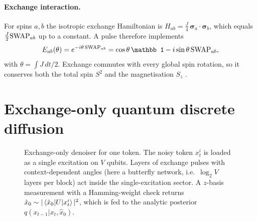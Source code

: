 \paragraph{Exchange interaction.}
For spins $a,b$ the isotropic exchange Hamiltonian is
$H_{ab}=\tfrac{J}{4}\,\bm\sigma_a\!\cdot\!\bm\sigma_b$, which equals $\tfrac{J}{2}\mathrm{SWAP}_{ab}$ up
to a constant. A pulse therefore implements
\begin{equation}
E_{ab}(\theta)=e^{-i\theta\,\SWAP_{ab}}=\cos\theta\,\mathbb 1-i\sin\theta\,\SWAP_{ab},
\end{equation}
with $\theta=\int J\,dt/2$. Exchange commutes with every global spin rotation, so it conserves both the
total spin $S^2$ and the magnetisation $S_z$ \citep{divincenzo2000universal,marvian2022restrictions}.

\section{Exchange-only quantum discrete diffusion}
\begin{figure}[t]
\centering
{}
\caption{Exchange-only denoiser for one token. The noisy token $x_t^i$ is loaded as a single excitation
on $V$ qubits. Layers of exchange pulses with context-dependent angles (here a butterfly network, i.e.\
$\log_2 V$ layers per block) act inside the single-excitation sector. A $z$-basis measurement with a
Hamming-weight check returns $\hat x_0\sim|\braket{\hat x_0|U|x_t^i}|^2$, which is fed to the analytic
posterior $q(x_{t-1}|x_t,\hat x_0)$.}
\label{fig:schematic}
\end{figure}

